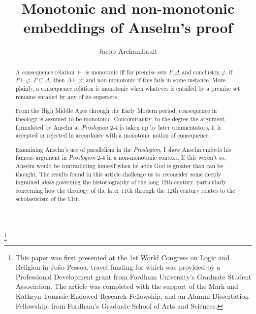 \documentclass[]{birkjour}
\begin{document}
	
\title{Monotonic and non-monotonic embeddings of Anselm's proof}
\author{Jacob Archambault}
\address{
	Fordham University \\
	441 E. Fordham Rd \\
	Bronx, NY 10458 \\
	United States of America}

\begin{abstract}
A consequence relation $\vdash$ is monotonic iff for premise sets $\Gamma, \Delta$ and conclusion $\varphi$, if $\Gamma \vdash \varphi$, $\Gamma \subseteq \Delta$, then $\Delta \vdash \varphi$; and non-monotonic if this fails in some instance.  More plainly, a consequence relation is monotonic when whatever is entailed by a premise set remains entailed by any of its supersets.

From the High Middle Ages through the Early Modern period, consequence in theology is assumed to be monotonic. Concomitantly, to the degree the argument formulated by Anselm at \textit{Proslogion} 2-4 is taken up by later commentators, it is accepted or rejected in accordance with a monotonic notion of consequence.

Examining Anselm's use of parallelism in the \textit{Proslogion}, I show Anselm embeds his famous argument in \textit{Proslogion} 2-4 in a non-monotonic context. If this weren't so, Anselm would be contradicting himself when he adds God is greater than can be thought. The results found in this article challenge us to reconsider some deeply ingrained ideas governing the historiography of the long 12th century, particularly concerning how the theology of the later 11th through the 12th century relates to the scholasticism of the 13th.
\end{abstract}
\thanks{This paper was first presented at the 1st World Congress on Logic and Religion in Jo\~{a}o Pessoa, travel funding for which was provided by a Professional Development grant from Fordham University's Graduate Student Association. The article was completed with the support of the Mark and Kathryn Tomasic Endowed Research Fellowship, and an Alumni Dissertation Fellowship, from Fordham's Graduate School of Arts and Sciences.}
\maketitle
\end{document}
